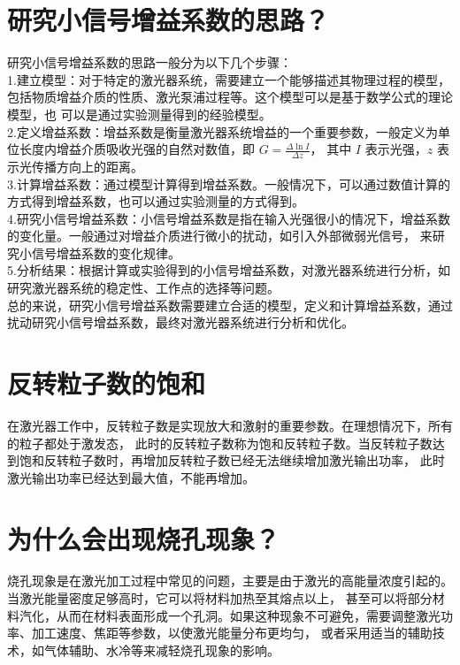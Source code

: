\documentclass[12pt, a4paper, oneside]{article}
\begin{document}
\begin{spacing}{2.0}
\section{研究小信号增益系数的思路？  }
研究小信号增益系数的思路一般分为以下几个步骤：
\\
1.建立模型：对于特定的激光器系统，需要建立一个能够描述其物理过程的模型，包括物质增益介质的性质、激光泵浦过程等。这个模型可以是基于数学公式的理论模型，也
可以是通过实验测量得到的经验模型。
\\
2.定义增益系数：增益系数是衡量激光器系统增益的一个重要参数，一般定义为单位长度内增益介质吸收光强的自然对数值，即 $G = \frac{\Delta \ln I}{\Delta z}$，
其中 $I$ 表示光强，$z$ 表示光传播方向上的距离。
\\
3.计算增益系数：通过模型计算得到增益系数。一般情况下，可以通过数值计算的方式得到增益系数，也可以通过实验测量的方式得到。\\
4.研究小信号增益系数：小信号增益系数是指在输入光强很小的情况下，增益系数的变化量。一般通过对增益介质进行微小的扰动，如引入外部微弱光信号，
来研究小信号增益系数的变化规律。
\\
5.分析结果：根据计算或实验得到的小信号增益系数，对激光器系统进行分析，如研究激光器系统的稳定性、工作点的选择等问题。\\
总的来说，研究小信号增益系数需要建立合适的模型，定义和计算增益系数，通过扰动研究小信号增益系数，最终对激光器系统进行分析和优化。

\section{反转粒子数的饱和}
在激光器工作中，反转粒子数是实现放大和激射的重要参数。在理想情况下，所有的粒子都处于激发态，
此时的反转粒子数称为饱和反转粒子数。当反转粒子数达到饱和反转粒子数时，再增加反转粒子数已经无法继续增加激光输出功率，
此时激光输出功率已经达到最大值，不能再增加。




\section{为什么会出现烧孔现象？}

烧孔现象是在激光加工过程中常见的问题，主要是由于激光的高能量浓度引起的。当激光能量密度足够高时，它可以将材料加热至其熔点以上，
甚至可以将部分材料汽化，从而在材料表面形成一个孔洞。如果这种现象不可避免，需要调整激光功率、加工速度、焦距等参数，以使激光能量分布更均匀，
或者采用适当的辅助技术，如气体辅助、水冷等来减轻烧孔现象的影响。


\end{spacing}{}
\end{document}
